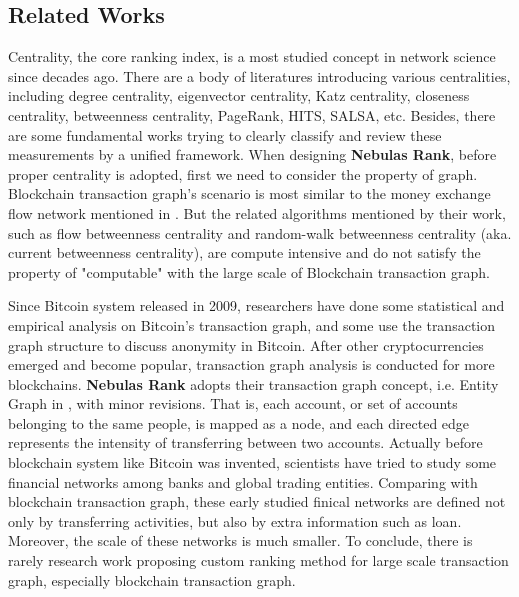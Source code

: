 \subsection{Related Works} \label{subsec:related}

Centrality, the core ranking index, is a most studied concept in network science since decades ago\cite{newman2010networks}. There are a body of literatures introducing various centralities, including degree centrality\cite{freeman1979set}, eigenvector centrality\cite{bonacich1972factoring}, Katz centrality\cite{katz1953new}, closeness centrality\cite{sabidussi1966centrality}, betweenness centrality\cite{freeman1977set}\cite{freeman1978centrality}\cite{freeman1991centrality}\cite{noh2004random}\cite{newman2005measure}, PageRank\cite{Brin2010}, HITS\cite{kleinberg1999authoritative}, SALSA\cite{Science2001}, etc. Besides, there are some fundamental works trying to clearly classify and review these measurements by a unified framework\cite{Borgatti2005}\cite{Borgatti2006}\cite{Lu2016}. When designing \textbf{Nebulas Rank}, before proper centrality is adopted, first we need to consider the property of graph. Blockchain transaction graph's scenario is most similar to the money exchange flow network mentioned in \cite{Borgatti2005}. But the related algorithms mentioned by their work, such as flow betweenness centrality\cite{freeman1991centrality} and random-walk betweenness centrality (aka. current betweenness centrality)\cite{newman2005measure}, are compute intensive and do not satisfy the property of "computable" with the large scale of Blockchain transaction graph.

Since Bitcoin\cite{Nakamoto2008} system released in 2009, researchers have done some statistical and empirical analysis on Bitcoin's transaction graph\cite{Ron}\cite{Haslhofer}\cite{NielKondor2014}\cite{Baumann2014}, and some use the transaction graph structure to discuss anonymity in Bitcoin\cite{Meiklejohn2013}\cite{Ober2013}\cite{pham2016anomaly}\cite{Fleder2015}\cite{Ferrin2015}. After other cryptocurrencies emerged and become popular, transaction graph analysis is conducted for more blockchains\cite{Chang2017}\cite{Anderson2016}. \textbf{Nebulas Rank} adopts their transaction graph concept, i.e. Entity Graph in \cite{Tschorsch2015}, with minor revisions. That is, each account, or set of accounts belonging to the same people, is mapped as a node, and each directed edge represents the intensity of transferring between two accounts. Actually before blockchain system like Bitcoin was invented, scientists have tried to study some financial networks among banks and global trading entities\cite{propper2008towards}\cite{Boss2004}\cite{Serrano2007}\cite{Bech2008}\cite{Fagiolo2009}\cite{Morten2006}\cite{Boss2004a}\cite{Krempel2002}\cite{Serrano2003}. Comparing with blockchain transaction graph, these early studied finical networks are defined not only by transferring activities, but also by extra information such as loan. Moreover, the scale of these networks is much smaller. To conclude, there is rarely research work proposing custom ranking method for large scale transaction graph, especially blockchain transaction graph.

